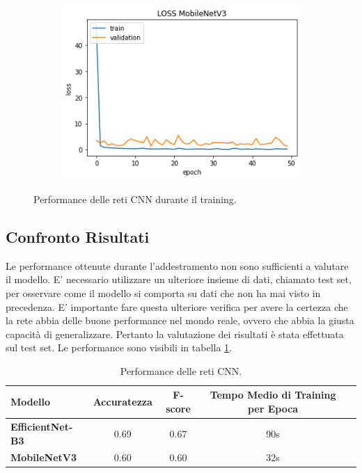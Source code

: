 \documentclass[11pt]{report}
\begin{document}
\begin{figure}[h]
\begin{subfigure}[t]{.45\textwidth}
	\end{subfigure}
	\quad
	\begin{subfigure}[t]{.45\textwidth}
	\centering
    \includegraphics[scale = 0.5]{img/Loss-mobile.png}
	\end{subfigure}
	\quad
\caption{Performance delle reti CNN durante il training.}
\label{fig:train-CNN}
\end{figure}


\subsection{Confronto Risultati}

Le performance ottenute durante l'addestramento non sono sufficienti a valutare il modello. E' necessario utilizzare un ulteriore insieme di dati, chiamato test set, per osservare come il modello si comporta su dati che non ha mai visto in precedenza. E' importante fare questa ulteriore verifica per avere la certezza che la rete abbia delle buone performance nel mondo reale, ovvero che abbia la giusta capacità di generalizzare. Pertanto la valutazione dei risultati è stata effettuata sul test set. Le performance sono visibili in tabella \ref{tab2}.



\begin{table}[h]
\caption{Performance delle reti CNN.}
\label{tab2}
\centering
\begin{tabular}{|l|c|c|c|c|}
\hline
\textbf{Modello} &  \textbf{Accuratezza} & \textbf{F-score}  & \textbf{Tempo Medio di Training per Epoca}\\
\hline
\textbf{EfficientNet-B3} &  0.69  & 0.67 & 90s\\
\textbf{MobileNetV3} &  0.60 & 0.60 & 32s\\
\hline
\end{tabular}
\end{table}
\end{document}
